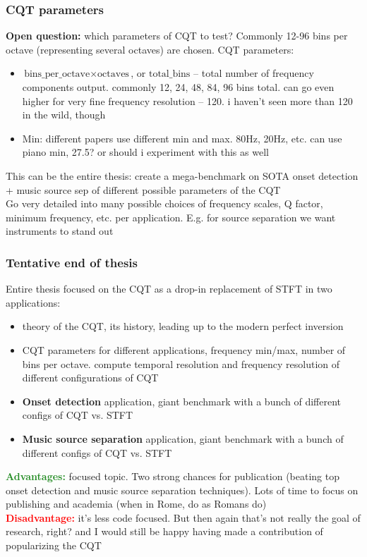 \documentclass[usenames,dvipsnames]{beamer}
\begin{document}
\begin{frame}
	\frametitle{CQT parameters}
	\textbf{Open question:} which parameters of CQT to test? Commonly 12-96 bins per octave (representing several octaves) are chosen.
	CQT parameters:
	\begin{itemize}
		\item
			$\text{bins\_per\_octave} \times \text{octaves}$, or $\text{total\_bins}$ -- total number of frequency components output. commonly 12, 24, 48, 84, 96 bins total. can go even higher for very fine frequency resolution -- 120. i haven't seen more than 120 in the wild, though
		\item
			Min: different papers use different min and max. 80Hz, 20Hz, etc. can use piano min, 27.5? or should i experiment with this as well
	\end{itemize}
	This can be the entire thesis: create a mega-benchmark on SOTA onset detection + music source sep of different possible parameters of the CQT\\
	Go very detailed into many possible choices of frequency scales, Q factor, minimum frequency, etc. per application. E.g. for source separation we want instruments to stand out
\end{frame}

\begin{frame}
	\frametitle{Tentative end of thesis}
	Entire thesis focused on the CQT as a drop-in replacement of STFT in two applications:
	\begin{itemize}
		\item
			theory of the CQT, its history, leading up to the modern perfect inversion
		\item
			CQT parameters for different applications, frequency min/max, number of bins per octave. compute temporal resolution and frequency resolution of different configurations of CQT
		\item
			\textbf{Onset detection} application, giant benchmark with a bunch of different configs of CQT vs. STFT
		\item
			\textbf{Music source separation} application, giant benchmark with a bunch of different configs of CQT vs. STFT
	\end{itemize}
	\textcolor{ForestGreen}{\textbf{Advantages:}} focused topic. Two strong chances for publication (beating top onset detection and music source separation techniques). Lots of time to focus on publishing and academia (when in Rome, do as Romans do)\\
	\textcolor{red}{\textbf{Disadvantage:}} it's less code focused. But then again that's not really the goal of research, right? and I would still be happy having made a contribution of popularizing the CQT
\end{frame}
\end{document}
